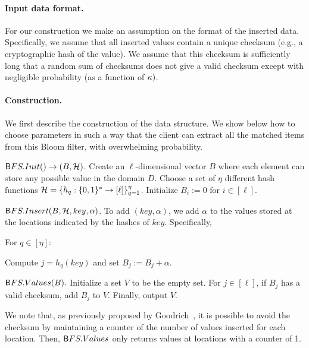 \paragraph{Input data format.}
For our construction we make an assumption on the format of the inserted data.  Specifically, we assume that all inserted values contain a unique checksum (e.g., a cryptographic hash of the value).  We assume that this checksum is sufficiently long that a random sum of checksums does not give a valid checksum except with negligible probability (as a function of $\secparam)$.



\paragraph{Construction.}
We first describe the construction of the data structure.  We show below
how to choose parameters in such a way that the client can extract all the matched items from this Bloom
filter, with
overwhelming probability.


\BI
\item ${\sf BFS.Init}() \to (B, \HHH)$.
Create an $\ell$-dimensional vector $B$ where each element can store any possible value in the domain $D$.
Choose a set of $\eta$
different hash functions  $\HHH = \{ h_q: \zo^* \to [\ell]
\}_{q=1}^\eta$. Initialize $B_i := 0$ for $i \in [\ell]$. 


\item ${\sf BFS.Insert}(B, \HHH, key, \alpha)$. 
To add $(key, \alpha)$, we add $\alpha$ to the values
stored at the locations indicated by the hashes of $key$. Specifically,
  \BI
  \item For $q \in [\eta]$:
    \BI
    \item[] 
    Compute $j = h_q(key)$ and set $B_j := B_j + \alpha$. 
    \EI
  \EI

\item ${\sf BFS.Values}(B).$
  Initialize a set $V$ to be the empty set. 
  For $j \in [\ell]$, if $B_j$ has a valid checksum, add $B_j$ to $V$.
  Finally, output $V$. 
\EI

We note that, as previously proposed by Goodrich~\cite{SPAA:Goodrich11}, it is possible to avoid the checksum by maintaining a counter of the number of values inserted for each location.  Then, ${\sf BFS.Values}$ only returns values at locations with a counter of 1.

